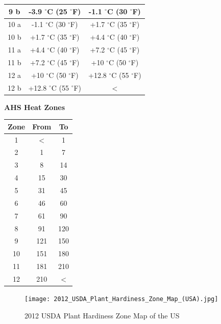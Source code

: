 \documentclass[10pt]{extarticle}
\begin{document}
\begin{center}
\begin{tabular}{|c|c|c|}
\hline 
9 b &	-3.9 $^{\circ}$C (25 $^{\circ}$F) &	-1.1 $^{\circ}$C (30 $^{\circ}$F)
\\
\hline 
10 a &	-1.1 $^{\circ}$C (30 $^{\circ}$F) &	+1.7 $^{\circ}$C (35 $^{\circ}$F)
\\
\hline 
10 b &	+1.7 $^{\circ}$C (35 $^{\circ}$F) &	+4.4 $^{\circ}$C (40 $^{\circ}$F)
\\
\hline 
11 a &	+4.4 $^{\circ}$C (40 $^{\circ}$F) &	+7.2 $^{\circ}$C (45 $^{\circ}$F)
\\
\hline 
11 b &	+7.2 $^{\circ}$C (45 $^{\circ}$F) &	+10 $^{\circ}$C (50 $^{\circ}$F)
\\
\hline 
12 a &	+10 $^{\circ}$C (50 $^{\circ}$F) & +12.8 $^{\circ}$C (55 $^{\circ}$F)
\\
\hline 
12 b &  +12.8 $^{\circ}$C (55 $^{\circ}$F)  & $<$ \\
\hline 
\end{tabular}
\end{center}
\begin{center}
\textbf{AHS Heat Zones} \\
\begin{tabular}{|c|c|c|}
	\hline
	Zone &	From &	To
\\
	\hline
	1 & $<$ &  1
\\
	\hline
	2 &	1 &	7
\\
	\hline
	3 &	8 &	14
\\
	\hline
	4 &	15 & 30
\\
	\hline
	5 &	31 & 45
\\
	\hline
	6 &	46 & 60
\\
	\hline
	7 &	61 & 90
\\
	\hline
	8 &	91 & 120
\\
	\hline
	9 &	121 & 150 \\
	\hline
	10 & 151 & 180
\\
	\hline
	11 & 181 & 210
\\
	\hline
	12 & 210 & $<$ \\
	\hline
\end{tabular}
\end{center}



\begin{figure}
	\texttt{[image: 2012\_USDA\_Plant\_Hardiness\_Zone\_Map\_(USA).jpg]}
	\caption{2012 USDA Plant Hardiness Zone Map of the US}
	\label{fig:PlantHardinessZoneMapoftheUS}
\end{figure}
\end{document}
